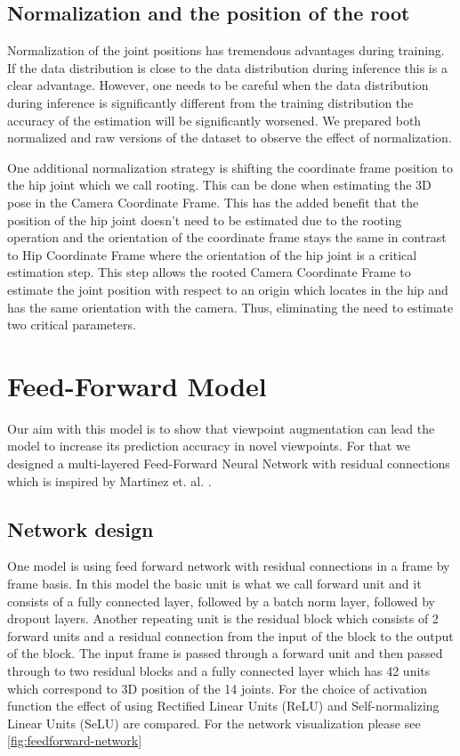 \subsection{Normalization and the position of the root}

Normalization of the joint positions has tremendous advantages during training. If the data distribution is close to the data distribution during inference this is a clear advantage. However, one needs to be careful when the data distribution during inference is significantly different from the training distribution the accuracy of the estimation will be significantly worsened. We prepared both normalized and raw versions of the dataset to observe the effect of normalization.

One additional normalization strategy is shifting the coordinate frame position to the hip joint which we call rooting. This can be done when estimating the 3D pose in the Camera Coordinate Frame. This has the added benefit that the position of the hip joint doesn't need to be estimated due to the rooting operation and the orientation of the coordinate frame stays the same in contrast to Hip Coordinate Frame where the orientation of the hip joint is a critical estimation step. This step allows the rooted Camera Coordinate Frame to estimate the joint position with respect to an origin which locates in the hip and has the same orientation with the camera. Thus, eliminating the need to estimate two critical parameters.

\section{Feed-Forward Model}

Our aim with this model is to show that viewpoint augmentation can lead the model to increase its prediction accuracy in novel viewpoints. For that we designed a multi-layered Feed-Forward Neural Network with residual connections \parencite{he2016deep} which is inspired by Martinez et. al. \parencite{martinez2017simple}.

\subsection{Network design}

One model is using feed forward network with residual connections in a frame by frame basis. In this model the basic unit is what we call forward unit and it consists of a fully connected layer, followed by a batch norm layer, followed by dropout layers. Another repeating unit is the residual block which consists of 2 forward units and a residual connection from the input of the block to the output of the block. The input frame is passed through a forward unit and then passed through to two residual blocks and a fully connected layer which has 42 units which correspond to 3D position of the 14 joints. For the choice of activation function the effect of using Rectified Linear Units (ReLU) \parencite{nair2010rectified} and Self-normalizing Linear Units (SeLU) \parencite{klambauer2017self} are compared. For the network visualization please see \autoref{fig:feedforward-network}

